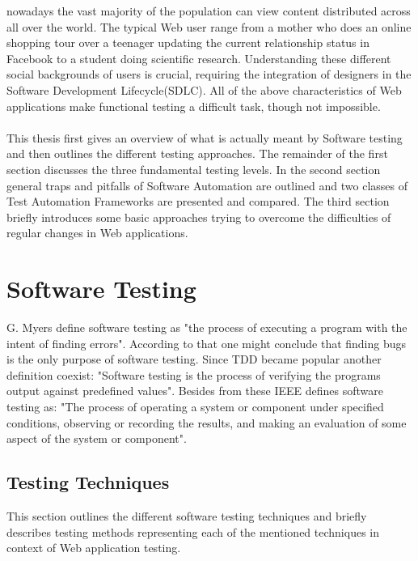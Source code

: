 \documentclass[12pt, notitlepage]{article}
\begin{document}
nowadays the vast majority of the population can view content distributed across all over the world. The typical Web user range from a
mother who does an online shopping tour over a teenager updating the current relationship status in Facebook to a student doing scientific research. Understanding these different social backgrounds of users is crucial, requiring the integration of designers in the Software Development Lifecycle(SDLC). All of the
above characteristics of Web applications make functional testing a difficult task, though not impossible.\\\\
This thesis first gives an overview of what is actually meant by Software testing and then outlines the different testing approaches. 
The remainder of the first section discusses the three fundamental testing levels. In the second section general traps and pitfalls of Software Automation are outlined and two classes of Test Automation Frameworks are presented and compared. The third section briefly introduces some basic approaches trying to overcome the difficulties of regular changes in Web applications. 
\newpage

\section{Software Testing}
G. Myers\cite{art-of-software-testing} define software testing as "the process of executing a program with the intent of finding errors".
According to that one might conclude that finding bugs is the only purpose of software testing. Since TDD\cite{tdd} became popular
another definition coexist: "Software testing is the process of verifying the programs output against predefined values". Besides from 
these IEEE\cite{ieee-definition} defines software testing as: "The process of operating a system or component under specified conditions, observing or recording the results, and making an evaluation of some aspect of the system or component".\\
\subsection{Testing Techniques}
This section outlines the different software testing techniques\cite{testing-methods} and briefly describes testing methods representing each of the mentioned techniques in context of Web application testing.
\end{document}
